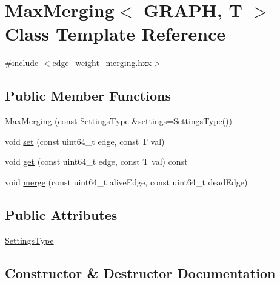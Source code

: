 \hypertarget{classMaxMerging}{}\section{Max\+Merging$<$ G\+R\+A\+PH, T $>$ Class Template Reference}
\label{classMaxMerging}


{\ttfamily \#include $<$edge\+\_\+weight\+\_\+merging.\+hxx$>$}

\subsection*{Public Member Functions}
\begin{DoxyCompactItemize}
\item 
\hyperlink{classMaxMerging_ae7c3bd69bc5aac17892a93dc59374865}{Max\+Merging} (const \hyperlink{classMaxMerging_aad2aed1692a3d6d3a0f2e940ea2907d8}{Settings\+Type} \&settings=\hyperlink{classMaxMerging_aad2aed1692a3d6d3a0f2e940ea2907d8}{Settings\+Type}())
\item 
void \hyperlink{classMaxMerging_a026a1b02b92cbc5dfae2252b5d149e79}{set} (const uint64\+\_\+t edge, const T val)
\item 
void \hyperlink{classMaxMerging_a307dbd439254d6a7cef38c8d70e371f1}{get} (const uint64\+\_\+t edge, const T val) const
\item 
void \hyperlink{classMaxMerging_ae6d472cc2dd8b0e5023c0fbce514c87f}{merge} (const uint64\+\_\+t alive\+Edge, const uint64\+\_\+t dead\+Edge)
\end{DoxyCompactItemize}
\subsection*{Public Attributes}
\begin{DoxyCompactItemize}
\item 
\hyperlink{classMaxMerging_aad2aed1692a3d6d3a0f2e940ea2907d8}{Settings\+Type}
\end{DoxyCompactItemize}


\subsection{Constructor \& Destructor Documentation}
\mbox{\label{classMaxMerging_ae7c3bd69bc5aac17892a93dc59374865}} 

